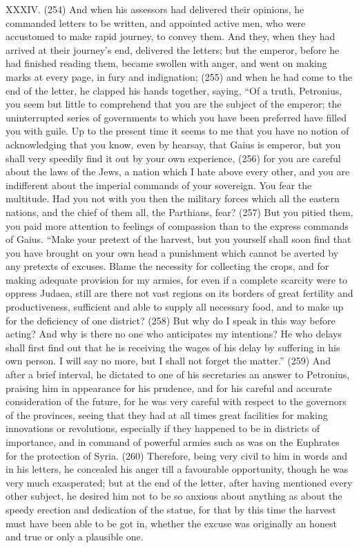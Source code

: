 XXXIV. (254) And when his assessors had delivered their opinions, he commanded letters to be
written, and appointed active men, who were accustomed to make rapid journey, to convey them.
And they, when they had arrived at their journey's end, delivered the letters; but the emperor,
before he had finished reading them, became swollen with anger, and went on making marks at
every page, in fury and indignation; (255) and when he had come to the end of the letter, he
clapped his hands together, saying, ``Of a truth, Petronius, you seem but little to comprehend that
you are the subject of the emperor; the uninterrupted series of governments to which you have
been preferred have filled you with guile. Up to the present time it seems to me that you have no
notion of acknowledging that you know, even by hearsay, that Gaius is emperor, but you shall very
speedily find it out by your own experience, (256) for you are careful about the laws of the Jews, a
nation which I hate above every other, and you are indifferent about the imperial commands of
your sovereign. You fear the multitude. Had you not with you then the military forces which all the
eastern nations, and the chief of them all, the Parthians, fear? (257) But you pitied them, you paid
more attention to feelings of compassion than to the express commands of Gaius. ``Make your
pretext of the harvest, but you yourself shall soon find that you have brought on your own head a
punishment which cannot be averted by any pretexts of excuses. Blame the necessity for
collecting the crops, and for making adequate provision for my armies, for even if a complete
scarcity were to oppress Judaea, still are there not vast regions on its borders of great fertility and
productiveness, sufficient and able to supply all necessary food, and to make up for the deficiency
of one district? (258) But why do I speak in this way before acting? And why is there no one who
anticipates my intentions? He who delays shall first find out that he is receiving the wages of his
delay by suffering in his own person. I will say no more, but I shall not forget the matter.'' (259) And
after a brief interval, he dictated to one of his secretaries an answer to Petronius, praising him in
appearance for his prudence, and for his careful and accurate consideration of the future, for he
was very careful with respect to the governors of the provinces, seeing that they had at all times
great facilities for making innovations or revolutions, especially if they happened to be in districts of
importance, and in command of powerful armies such as was on the Euphrates for the protection
of Syria. (260) Therefore, being very civil to him in words and in his letters, he concealed his anger
till a favourable opportunity, though he was very much exasperated; but at the end of the letter,
after having mentioned every other subject, he desired him not to be so anxious about anything as
about the speedy erection and dedication of the statue, for that by this time the harvest must have
been able to be got in, whether the excuse was originally an honest and true or only a plausible
one.

